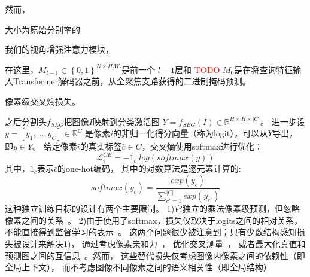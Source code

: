 






然而，







\todo






大小为原始分别率的

我们的视角增强注意力模块，














% 
% 
在这里，$M_{l-1} \in \left \{  0,1\right \} ^{N \times H_{l}W_{l}} $是前一个
$l-1$层和
\textcolor{red}{TODO}
$M_{0}$是在将查询特征输入Transformer解码器之前，从全聚焦支路获得的二进制掩码预测。
%
%
%
%
\par 
%
%
%












像素级交叉熵损失。



之后分割头$f_{SEG}$把图像$I$映射到分类激活图
$Y=f_{SEG}(I) \in \mathbb{R}^{H\times H \times |C|}$。
进一步设$y=\left [ y_{1},\dots, y_{C} \right ] \in\mathbb{R}^{C}$
是像素$i$的非归一化得分向量（称为logit），可以从$Y$导出，
即$y \in Y$。
给定像素$i$的真实标签$\bar{c} \in C$，交叉熵使用softmax进行优化：
\begin{equation}
	\mathcal{L}_{i}^{CE}=-1_{\bar{c}}^{\top } log(softmax(y))
	\label{chpt4:eq:loss_softmax}
\end{equation}
% 
% 
% 
% 
其中，$1_{\bar{c}}$表示$\bar{c}$的one-hot编码，
其中的对数算法是逐元素计算的:
\begin{equation}
	softmax(y_{c}) = \frac
	{exp(y_{c})}
	{ 
		\sum_{{c}'=1 }^{|C|} 
		exp(y_{{c}'}) 
	} 
\end{equation}
% 
% 
% 
% 
这种独立训练目标的设计有两个主要限制。
1)它独立的乘法像素级预测，但忽略像素之间的关系~\cite{zhao2019region}。
2)由于使用了softmax，损失仅取决于logits之间的相对关系，
不能直接得到监督学习的表示~\cite{pang2019rethinking}。
这两个问题很少被注意到；只有少数结构感知损失被设计来解决1)，
通过考虑像素亲和力~\cite{ke2018adaptive}，
优化交叉测量~\cite{berman2018lovasz}，
或者最大化真值和预测图之间的互信息~\cite{zhao2019region}。然而，
这些替代损失仅考虑图像内像素之间的依赖性（即全局上下文），
而不考虑图像不同像素之间的语义相关性（即全局结构）
\par
% 
% 
% 
% 

